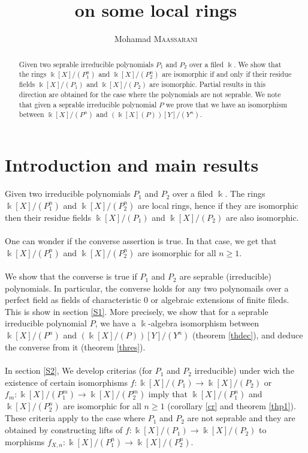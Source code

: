 \documentclass[12pt, reqno]{amsart}
\newcommand{\K}{ {\Bbbk} }
\newcommand{\KP}{{\Bbbk[X]/(P_1)}}
\newcommand{\KPP}{{\Bbbk[X]/(P_2)}}
\newcommand{\KPn}{{\Bbbk[X]/(P_1^n)}}
\newcommand{\KPPn}{{\Bbbk[X]/(P_2^n)}}
\begin{document}
 
\title{on some local rings}

 


 
\author{Mohamad \textsc{Maassarani} }
\maketitle
\begin{abstract}
Given two seprable irreducible polynomials $P_1$ and $P_2$ over a filed $\K$. We show that the rings $\KPn$ and $\KPPn$ are isomorphic if and only if their residue fields $\KP$ and $\KPP$ are isomorphic. Partial results in this direction are obtained for the case where the polynomials are not seprable. We note that given a seprable irreducible polynomial $P$ we prove that we have an isomorphism between $\K[X]/(P^n)$ and $(\K[X](P))[Y]/(Y^n)$.
\end{abstract}
\section*{Introduction and main results}
Given two irreducible polynomials $P_1$ and $P_2$ over a filed $\K$. The rings $\KPn$ and $\KPPn$ are local rings, hence if they are isomorphic then their residue fields $\KP$ and $\KPP$ are also isomorphic.\\\\
One can wonder if the converse assertion is true. In that case,  we get that $\KPn$ and $\KPPn$ are isomorphic for all $n\geq1$.\\\\
We show that the converse is true if $P_1$ and $P_2$ are seprable (irreducible) polynomials. In particular, the converse holds for any two polynomails over a perfect field as fields of characteristic $0$ or algebraic extensions of finite fileds. This is show in section \ref{S1}. More precisely, we show that for a seprable irreducible polynomial $P$, we have a $\K$-algebra isomorphism between $\K[X]/(P^n)$ and $(\K[X]/(P))[Y]/(Y^n)$ (theorem \ref{thdec}), and deduce the converse from it (theorem \ref{thres}).\\\\
In section \ref{S2},  We develop criterias (for $P_1$ and $P_2$ irreducible) under wich the existence of certain isomorphisms $f: \KP \to \KPP$ or $f_m: \K[X]/ (P_1^m)\to \K[X]/ (P_2^m)$ imply that $\KPn$ and $\KPPn$ are isomorphic for all $n\geq 1$ (corollary \ref{cr} and theorem \ref{thp1}). These criteria apply to the case where $P_1$ and $P_2$ are not seprable and they are obtained by constructing lifts of $f:\KP \to \KPP$ to morphisms $f_{X,n}: \KPn\to \KPPn$.
\end{document}
